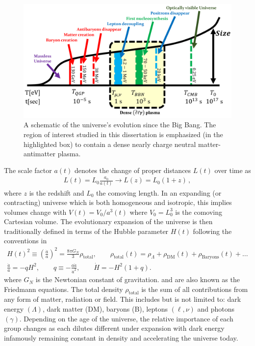 \begin{figure}[ht]
 \centering
 \includegraphics[width=0.95\linewidth]{plots/chap01intro/thesis_universe.png}
 \caption{A schematic of the universe's evolution since the Big Bang. The region of interest studied in this dissertation is emphasized (in the highlighted box) to contain a dense nearly charge neutral matter-antimatter plasma.}
 \label{fig:cosmo} 
\end{figure}

The scale factor $a(t)$ denotes the change of proper distances $L(t)$ over time as
\begin{gather}
    L(t)=L_{0}\frac{a_{0}}{a(t)}\rightarrow L(z)=L_{0}(1+z)\,,
\end{gather}
where $z$ is the redshift and $L_{0}$ the comoving length. In an expanding (or contracting) universe which is both homogeneous and isotropic, this implies volumes change with $V(t)=V_{0}/a^{3}(t)$ where $V_{0}=L_{0}^{3}$ is the comoving Cartesian volume. The evolutionary expansion of the universe is then traditionally defined in terms of the Hubble parameter $H(t)$ following the conventions in~\cite{weinberg1972gravitation}
\begin{gather}
  \label{Friedmann:1} H(t)^{2}\equiv\left(\frac{\dot a}{a}\right)^2=\frac{8\pi G_{N}}{3}\rho_\mathrm{total},\qquad \rho_\mathrm{total}(t)=\rho_{\Lambda}+\rho_\mathrm{DM}(t)+\rho_\mathrm{Baryons}(t)+\ldots\\
  \label{Friedmann:2}
  \frac{\ddot a}{a}=-qH^2,\qquad 
q\equiv -\frac{a\ddot a}{\dot a^2},\qquad \dot H=-H^2(1+q).
\end{gather}
where $G_N$ is the Newtonian constant of gravitation.  and  are also known as the Friedmann equations. The total density $\rho_\mathrm{total}$ is the sum of all contributions from any form of matter, radiation or field. This includes but is not limited to: dark energy $(\Lambda)$, dark matter (DM), baryons (B), leptons $(\ell,\nu)$ and photons $(\gamma)$. Depending on the age of the universe, the relative importance of each group changes as each dilutes different under expansion with dark energy infamously remaining constant in density and accelerating the universe today.

